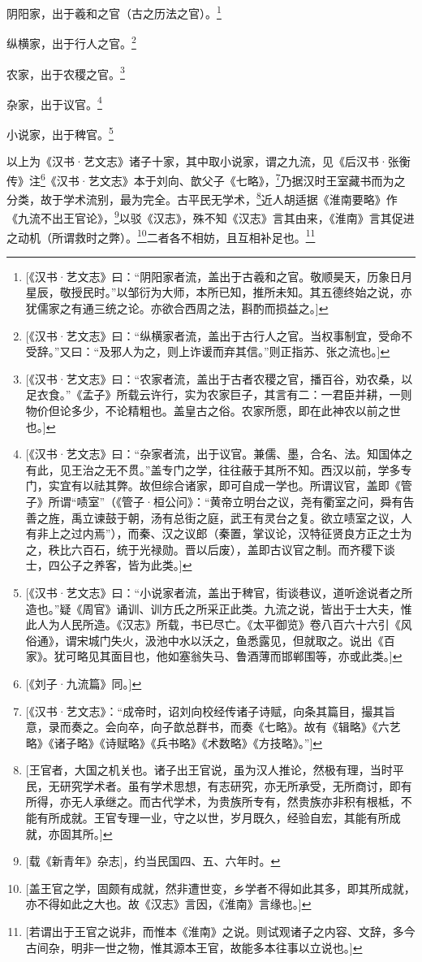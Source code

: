 阴阳家，出于羲和之官（古之历法之官）。\footnote{[《汉书·艺文志》曰：“阴阳家者流，盖出于古羲和之官。敬顺昊天，历象日月星辰，敬授民时。”以邹衍为大师，本所已知，推所未知。其五德终始之说，亦犹儒家之有通三统之论。亦欲合西周之法，斟酌而损益之。]}

纵横家，出于行人之官。\footnote{[《汉书·艺文志》曰：“纵横家者流，盖出于古行人之官。当权事制宜，受命不受辞。”又曰：“及邪人为之，则上诈谖而弃其信。”则正指苏、张之流也。]}

农家，出于农稷之官。\footnote{[《汉书·艺文志》曰：“农家者流，盖出于古者农稷之官，播百谷，劝农桑，以足衣食。”《孟子》所载云许行，实为农家巨子，其言有二：一君臣并耕，一则物价但论多少，不论精粗也。盖皇古之俗。农家所愿，即在此神农以前之世也。]}

杂家，出于议官。\footnote{[《汉书·艺文志》曰：“杂家者流，出于议官。兼儒、墨，合名、法。知国体之有此，见王治之无不贯。”盖专门之学，往往蔽于其所不知。西汉以前，学多专门，实宜有以祛其弊。故但综合诸家，即可自成一学也。所谓议官，盖即《管子》所谓“啧室”（《管子·桓公问》：“黄帝立明台之议，尧有衢室之问，舜有告善之旌，禹立谏鼓于朝，汤有总街之庭，武王有灵台之复。欲立啧室之议，人有非上之过内焉”），而秦、汉之议郎（秦置，掌议论，汉特征贤良方正之士为之，秩比六百石，统于光禄勋。晋以后废），盖即古议官之制。而齐稷下谈士，四公子之养客，皆为此类。]}

小说家，出于稗官。\footnote{[《汉书·艺文志》曰：“小说家者流，盖出于稗官，街谈巷议，道听途说者之所造也。”疑《周官》诵训、训方氏之所采正此类。九流之说，皆出于士大夫，惟此人为人民所造。《汉志》所载，书已尽亡。《太平御览》卷八百六十六引《风俗通》，谓宋城门失火，汲池中水以沃之，鱼悉露见，但就取之。说出《百家》。犹可略见其面目也，他如塞翁失马、鲁酒薄而邯郸围等，亦或此类。]}

以上为《汉书·艺文志》诸子十家，其中取小说家，谓之九流，见《后汉书·张衡传》注\footnote{[《刘子·九流篇》同。]}《汉书·艺文志》本于刘向、歆父子《七略》，\footnote{[《汉书·艺文志》：“成帝时，诏刘向校经传诸子诗赋，向条其篇目，撮其旨意，录而奏之。会向卒，向子歆总群书，而奏《七略》。故有《辑略》《六艺略》《诸子略》《诗赋略》《兵书略》《术数略》《方技略》。”]}乃据汉时王室藏书而为之分类，故于学术流别，最为完全。古平民无学术，\footnote{[王官者，大国之机关也。诸子出王官说，虽为汉人推论，然极有理，当时平民，无研究学术者。虽有学术思想，有志研究，亦无所承受，无所商讨，即有所得，亦无人承继之。而古代学术，为贵族所专有，然贵族亦非积有根柢，不能有所成就。王官专理一业，守之以世，岁月既久，经验自宏，其能有所成就，亦固其所。]}近人胡适据《淮南要略》作《九流不出王官论》，\footnote{[载《新青年》杂志]，约当民国四、五、六年时。}以驳《汉志》，殊不知《汉志》言其由来，《淮南》言其促进之动机（所谓救时之弊）。\footnote{[盖王官之学，固颇有成就，然非遭世变，乡学者不得如此其多，即其所成就，亦不得如此之大也。故《汉志》言因，《淮南》言缘也。]}二者各不相妨，且互相补足也。\footnote{[若谓出于王官之说非，而惟本《淮南》之说。则试观诸子之内容、文辞，多今古间杂，明非一世之物，惟其源本王官，故能多本往事以立说也。]}
